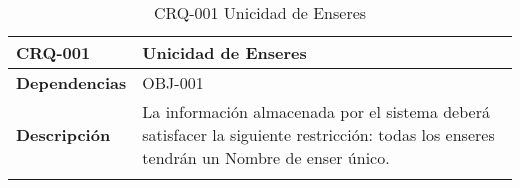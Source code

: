 \begin{center}
\begin{longtable}{|p{80pt}|p{9cm}|}
\hline
\textbf{CRQ-001} & Unicidad de Enseres \\ \hline
\textbf{Dependencias} & OBJ-001 \\ \hline
\textbf{Descripción} & La información almacenada por el sistema deberá satisfacer la siguiente restricción: todas los enseres tendrán un Nombre de enser único. \\ \hline
\caption{CRQ-001 Unicidad de Enseres}
\end{longtable}
\end{center}

